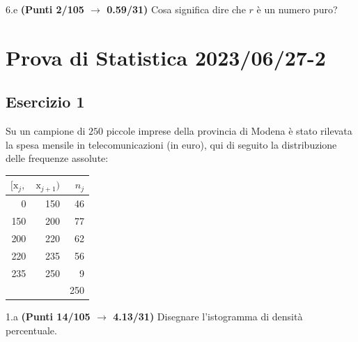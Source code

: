 \documentclass[
  11pt,
]{book}
\theoremstyle{mytheoremstyle}
\theoremstyle{mydefstyle}
\begin{document}
6.e \textbf{(Punti 2/105 \(\rightarrow\) 0.59/31)} Cosa significa dire che \(r\) è un numero puro?

\section{Prova di Statistica 2023/06/27-2}\label{prova-di-statistica-20230627-2}

\subsection{Esercizio 1}\label{esercizio-1-29}

Su un campione di \(250\) piccole imprese della provincia di Modena è stato rilevata la spesa mensile in telecomunicazioni (in euro), qui di seguito
la distribuzione delle frequenze assolute:

\begin{table}[H]
\centering
\begin{tabular}{rrr}
\toprule
$[\text{x}_j,$ & $\text{x}_{j+1})$ & $n_j$\\
\midrule
0 & 150 & 46\\
150 & 200 & 77\\
200 & 220 & 62\\
220 & 235 & 56\\
235 & 250 & 9\\
 &  & 250\\
\bottomrule
\end{tabular}
\end{table}

1.a \textbf{(Punti 14/105 \(\rightarrow\) 4.13/31)} Disegnare l'istogramma di densità percentuale.
\end{document}
